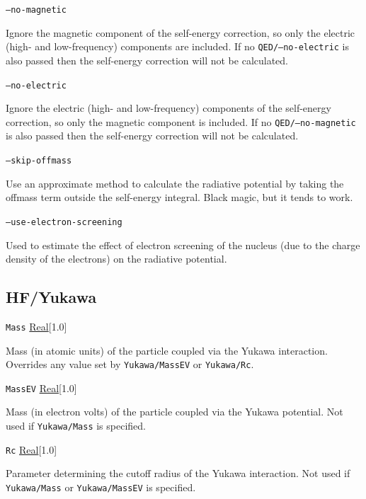 \documentclass{report}
\begin{document}
\texttt{--no-magnetic}
\begin{adjustwidth}{1cm}{}
Ignore the magnetic component of the self-energy correction, so only the electric (high- and
low-frequency) components are included. If no \texttt{QED/--no-electric} is also passed then the self-energy
correction will not be calculated.
\end{adjustwidth}

\texttt{--no-electric}
\begin{adjustwidth}{1cm}{}
Ignore the electric (high- and low-frequency) components of the self-energy correction, so only the
magnetic component is included. If no \texttt{QED/--no-magnetic} is also passed then the self-energy
correction will not be calculated.
\end{adjustwidth}

\texttt{--skip-offmass}
\begin{adjustwidth}{1cm}{}
Use an approximate method to calculate the radiative potential by taking the offmass term outside the self-energy integral.
Black magic, but it tends to work.
\end{adjustwidth}

\texttt{--use-electron-screening}
\begin{adjustwidth}{1cm}{}
Used to estimate the effect of electron screening of the nucleus (due to the charge density of the electrons)
on the radiative potential.
\end{adjustwidth}

\subsection{HF/Yukawa}
\texttt{Mass} \uline{Real}[1.0]
\begin{adjustwidth}{1cm}{}
Mass (in atomic units) of the particle coupled via the Yukawa interaction. Overrides any value set by
\texttt{Yukawa/MassEV} or \texttt{Yukawa/Rc}.
\end{adjustwidth}

\texttt{MassEV} \uline{Real}[1.0]
\begin{adjustwidth}{1cm}{}
Mass (in electron volts) of the particle coupled via the Yukawa potential. Not used if
\texttt{Yukawa/Mass} is specified.
\end{adjustwidth}

\texttt{Rc} \uline{Real}[1.0]
\begin{adjustwidth}{1cm}{}
Parameter determining the cutoff radius of the Yukawa interaction. Not used if \texttt{Yukawa/Mass}
or \texttt{Yukawa/MassEV} is specified.
\end{adjustwidth}
\end{document}
